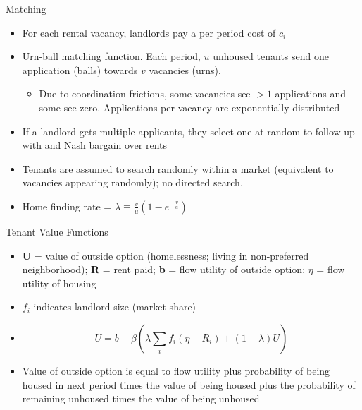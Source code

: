 \documentclass[10pt, xcolor=dvipsnames]{beamer}
\begin{document}
\begin{frame}{Matching}
    \begin{itemize}
    \item For each rental vacancy, landlords pay a per period cost of \textbf{$c_i$}
    \item Urn-ball matching function. Each period, \textbf{$u$} unhoused tenants send one application (balls) towards \textbf{$v$} vacancies (urns).
    \begin{itemize}
        \item Due to coordination frictions, some vacancies see $>1$ applications and some see zero. Applications per vacancy are exponentially distributed
    \end{itemize}
    \item If a landlord gets multiple applicants, they select one at random to follow up with and Nash bargain over rents
        
    \item Tenants are assumed to search randomly within a market (equivalent to vacancies appearing randomly); no directed search.
    \item Home finding rate = \textbf{$\lambda \equiv \frac{v}{u}(1-e^{-\frac{v}{u}})$}
\end{itemize}
\end{frame}

\begin{frame}{Tenant Value Functions}
\begin{itemize}
    \item \textbf{U} = value of outside option (homelessness; living in non-preferred neighborhood); \textbf{R} = rent paid; \textbf{b} = flow utility of outside option; \textbf{$\eta$} = flow utility of housing
    \item \textbf{$f_i$} indicates landlord size (market share)
    \item \begin{equation}
        U = b + \beta\left(\lambda \sum_{i} f_i(\eta - R_i) + (1-\lambda)U\right)\label{eq:tenant-val}
    \end{equation}
    \item Value of outside option is equal to flow utility plus probability of being housed in next period times the value of being housed plus the probability of remaining unhoused times the value of being unhoused
\end{itemize}
\end{frame}
\end{document}

